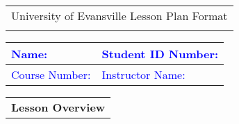 \begin{tabularx}{\textwidth}{Y}
  {\large University of Evansville Lesson Plan Format } \\
   \hline \\
\end{tabularx}


\begin{tabularx}{\textwidth}{|X|X|}
  \hline 
  \textcolor{blue}{Name:}          &   \textcolor{blue}{Student ID Number:} \\
  \hline 
  \textcolor{blue}{Course Number:} &   \textcolor{blue}{Instructor Name:} \\
  \hline 
\end{tabularx}

\vskip 10pt
  
\begin{tabularx}{\textwidth}{Y}
  {\bf Lesson Overview} \\
\end{tabularx}


